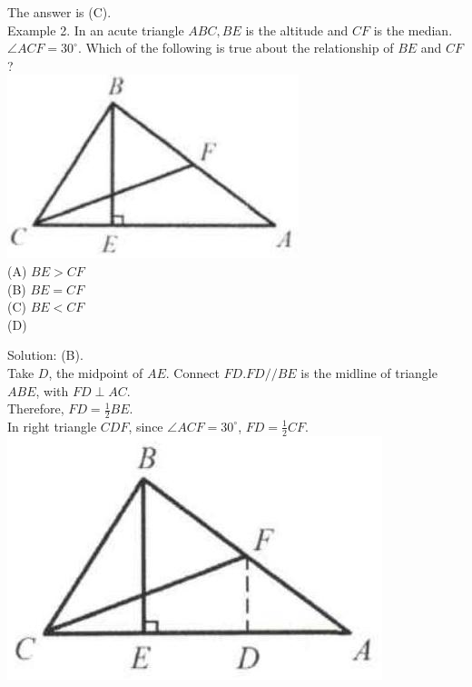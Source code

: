 \documentclass[10pt]{article}
\begin{document}
The answer is (C).\\
Example 2. In an acute triangle \(A B C, B E\) is the altitude and \(C F\) is the median. \(\angle A C F=30^{\circ}\). Which of the following is true about the relationship of \(B E\) and \(C F\) ?\\
\includegraphics[max width=\textwidth, center]{2025_04_17_97bc1f7e44d93c271a88g-035}\\
(A) \(B E>C F\)\\
(B) \(B E=C F\)\\
(C) \(B E<C F\)\\
(D)

Solution: (B).\\
Take \(D\), the midpoint of \(A E\). Connect \(F D . F D / / B E\) is the midline of triangle \(A B E\), with \(F D \perp A C\).\\
Therefore, \(F D=\frac{1}{2} B E\).\\
In right triangle \(C D F\), since \(\angle A C F=30^{\circ}\), \(F D=\frac{1}{2} C F\).\\
\includegraphics[max width=\textwidth, center]{2025_04_17_97bc1f7e44d93c271a88g-036(2)}
\end{document}

